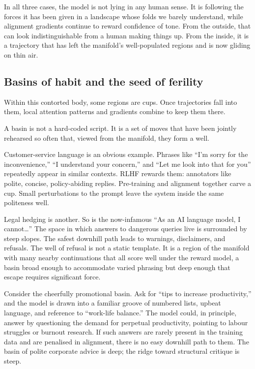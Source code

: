 \documentclass[12pt,a4paper]{article}
\begin{document}
In all three cases, the model is not lying in any human sense. It is following the forces it has been given in a landscape whose folds we barely understand, while alignment gradients continue to reward confidence of tone. From the outside, that can look indistinguishable from a human making things up. From the inside, it is a trajectory that has left the manifold's well-populated regions and is now gliding on thin air.

\subsection*{Basins of habit and the seed of ferility}

Within this contorted body, some regions are cups. Once trajectories fall into them, local attention patterns and gradients combine to keep them there.

A basin is not a hard-coded script. It is a set of moves that have been jointly rehearsed so often that, viewed from the manifold, they form a well.

Customer-service language is an obvious example. Phrases like ``I'm sorry for the inconvenience,'' ``I understand your concern,'' and ``Let me look into that for you'' repeatedly appear in similar contexts. RLHF rewards them: annotators like polite, concise, policy-abiding replies. Pre-training and alignment together carve a cup. Small perturbations to the prompt leave the system inside the same politeness well.

Legal hedging is another. So is the now-infamous ``As an AI language model, I cannot\ldots'' The space in which answers to dangerous queries live is surrounded by steep slopes. The safest downhill path leads to warnings, disclaimers, and refusals. The well of refusal is not a static template. It is a region of the manifold with many nearby continuations that all score well under the reward model, a basin broad enough to accommodate varied phrasing but deep enough that escape requires significant force.

Consider the cheerfully promotional basin. Ask for ``tips to increase productivity,'' and the model is drawn into a familiar groove of numbered lists, upbeat language, and reference to ``work-life balance.'' The model could, in principle, answer by questioning the demand for perpetual productivity, pointing to labour struggles or burnout research. If such answers are rarely present in the training data and are penalised in alignment, there is no easy downhill path to them. The basin of polite corporate advice is deep; the ridge toward structural critique is steep.
\end{document}
